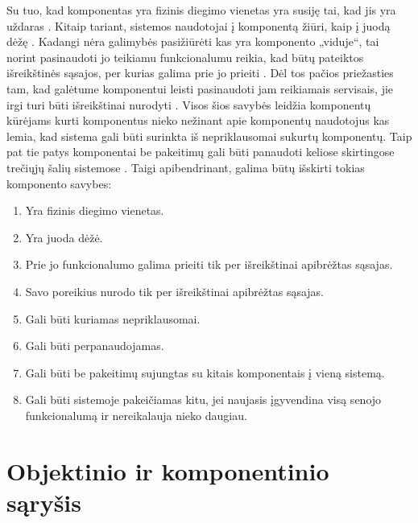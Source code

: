 Su tuo, kad komponentas yra fizinis diegimo vienetas yra susiję
tai, kad jis yra uždaras
\cite[36]{cs-beyond-object-oriented-programming}. Kitaip tariant,
sistemos naudotojai į komponentą žiūri, kaip į juodą
dėžę \cite[2]{Gill:2003:CMF:966221.966237}.
Kadangi nėra galimybės pasižiūrėti kas yra komponento „viduje“,
tai norint pasinaudoti jo teikiamu funkcionalumu reikia, kad būtų
pateiktos išreikštinės sąsajos, per kurias galima prie jo
prieiti
\cites[387]{objects-components-and-frameworks-with-uml}%
[36]{cs-beyond-object-oriented-programming}. Dėl tos
pačios priežasties tam, kad galėtume komponentui leisti pasinaudoti
jam reikiamais servisais, jie irgi turi būti išreikštinai nurodyti
\cites[387]{objects-components-and-frameworks-with-uml}%
[36]{cs-beyond-object-oriented-programming}. Visos šios
savybės leidžia komponentų kūrėjams kurti komponentus nieko
nežinant apie komponentų naudotojus
\cites[2]{Gill:2003:CMF:966221.966237}%
[139]{meyer1999components}
kas lemia, kad sistema gali būti surinkta iš nepriklausomai sukurtų
komponentų. Taip pat tie patys komponentai be pakeitimų gali būti
panaudoti keliose skirtingose trečiųjų šalių sistemose
\cites[388]{objects-components-and-frameworks-with-uml}%
[36]{cs-beyond-object-oriented-programming}. Taigi
apibendrinant, galima būtų išskirti tokias komponento savybes:
\begin{enumerate}
  \item \label{com:exe:deployment} Yra fizinis diegimo vienetas.
  \item \label{com:exe:blackbox} Yra juoda dėžė.
  \item \label{com:exe:interfaceprovider} Prie jo funkcionalumo galima
    prieiti tik per išreikštinai apibrėžtas sąsajas.
  \item \label{com:exe:interfaceuser} Savo poreikius nurodo tik per
    išreikštinai apibrėžtas sąsajas.
  \item \label{com:exe:independent} Gali būti kuriamas nepriklausomai.
  \item \label{com:exe:reusable} Gali būti perpanaudojamas.
  \item \label{com:exe:composed} Gali būti be pakeitimų sujungtas su
    kitais komponentais į vieną sistemą.
  \item \label{com:exe:interchangable} Gali būti sistemoje
    pakeičiamas kitu, jei naujasis įgyvendina visą senojo
    funkcionalumą ir nereikalauja nieko daugiau.
\end{enumerate}

\section{Objektinio ir komponentinio sąryšis}

